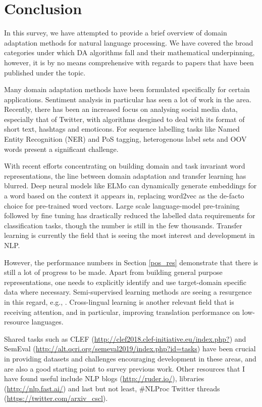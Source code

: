 \documentclass[12pt]{report}
\begin{document}
	
	\section{Conclusion}
	\label{conc}
	In this survey, we have attempted to provide a brief overview of domain adaptation methods for natural language processing. We have covered the broad categories under which DA algorithms fall and their mathematical underpinning, however, it is by no means comprehensive with regards to papers that have been published under the topic. \par Many domain adaptation methods have been formulated specifically for certain applications. Sentiment analysis in particular has seen a lot of work in the area. Recently, there has been an increased focus on analysing social media data, especially that of Twitter, with algorithms desgined to deal with its format of short text, hashtags and emoticons. For sequence labelling tasks like Named Entity Recognition (NER) and PoS tagging, heterogenous label sets and OOV words present a significant challenge. 
	\par With recent efforts concentrating on building domain and task invariant word representations, the line between domain adaptation and transfer learning has blurred. Deep neural models like ELMo can dynamically generate embeddings for a word based on the context it appears in, replacing word2vec as the de-facto choice for pre-trained word vectors. Large scale language-model pre-training followed by fine tuning has drastically reduced the labelled data requirements for classification tasks, though the number is still in the few thousands. Transfer learning is currently the field that is seeing the most interest and development in NLP.
	\par However, the performance numbers in Section \ref{pos_res} demonstrate that there is still a lot of progress to be made. Apart from building general purpose representations, one needs to explicitly identify and use target-domain specific data where necessary. Semi-supervised learning methods are seeing a resurgence in this regard, e.g., \citep{clark2018semi}. Cross-lingual learning is another relevant field that is receiving attention, and in particular, improving translation performance on low-resource languages.
	\par Shared tasks such as CLEF (\url{http://clef2018.clef-initiative.eu/index.php?}) and SemEval (\url{http://alt.qcri.org/semeval2019/index.php?id=tasks}) have been crucial in providing datasets and challenges encouraging development in these areas, and are also a good starting point to survey previous work. Other resources that I have found useful include NLP blogs (\url{http://ruder.io/}), libraries (\url{http://nlp.fast.ai/}) and last but not least, \#NLProc Twitter threads (\url{https://twitter.com/arxiv_cscl}).
	
	
	\newpage
	
	
	
	
\end{document}
